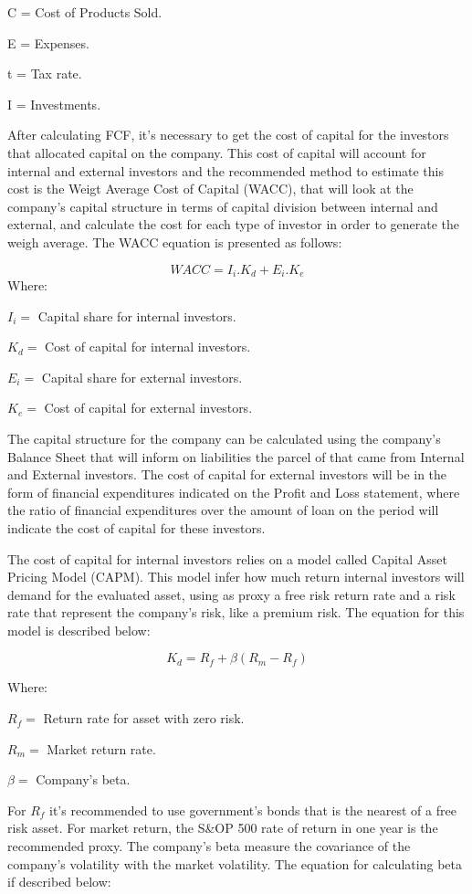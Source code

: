 \documentclass[
  11pt,
  a4paper,
]{article}
\begin{document}
C = Cost of Products Sold.

E = Expenses.

t = Tax rate.

I = Investments.

After calculating FCF, it's necessary to get the cost of capital for the investors that allocated capital on the company. This cost of capital will account for internal and external investors and the recommended method to estimate this cost is the Weigt Average Cost of Capital (WACC), that will look at the company's capital structure in terms of capital division between internal and external, and calculate the cost for each type of investor in order to generate the weigh average. The WACC equation is presented as follows:

\[WACC = I_i.K_d + E_i.K_e\]
Where:

\(I_i =\) Capital share for internal investors.

\(K_d =\) Cost of capital for internal investors.

\(E_i =\) Capital share for external investors.

\(K_e =\) Cost of capital for external investors.

The capital structure for the company can be calculated using the company's Balance Sheet that will inform on liabilities the parcel of that came from Internal and External investors. The cost of capital for external investors will be in the form of financial expenditures indicated on the Profit and Loss statement, where the ratio of financial expenditures over the amount of loan on the period will indicate the cost of capital for these investors.

The cost of capital for internal investors relies on a model called Capital Asset Pricing Model (CAPM). This model infer how much return internal investors will demand for the evaluated asset, using as proxy a free risk return rate and a risk rate that represent the company's risk, like a premium risk. The equation for this model is described below:

\[K_d = R_f + \beta(R_m-R_f)\]

Where:

\(R_f =\) Return rate for asset with zero risk.

\(R_m =\) Market return rate.

\(\beta =\) Company's beta.

For \(R_f\) it's recommended to use government's bonds that is the nearest of a free risk asset. For market return, the S\&OP 500 rate of return in one year is the recommended proxy. The company's beta measure the covariance of the company's volatility with the market volatility. The equation for calculating beta if described below:
\end{document}
